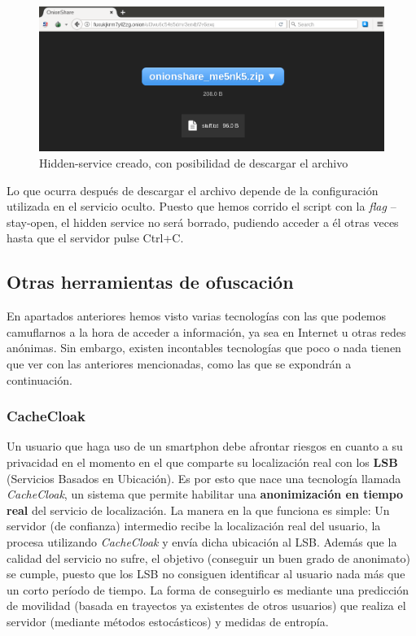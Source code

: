 \begin{figure}[H]
	\centerline{
		\mbox{\includegraphics[width=5.00in]{images/onionshare2.png}}
	}
	\caption{Hidden-service creado, con posibilidad de descargar el archivo}
	\label{fig:onionsharehiddenservice}
\end{figure} 

Lo que ocurra después de descargar el archivo depende de la configuración utilizada en el servicio oculto. Puesto que hemos corrido el script con la \textit{flag } --stay-open, el hidden service no será borrado, pudiendo acceder a él otras veces hasta que el servidor pulse Ctrl+C.

\subsection{Otras herramientas de ofuscación}

En apartados anteriores hemos visto varias tecnologías con las que podemos camuflarnos a la hora de acceder a información, ya sea en Internet u otras redes anónimas. Sin embargo, existen incontables tecnologías que poco o nada tienen que ver con las anteriores mencionadas, como las que se expondrán a continuación.

\subsubsection{CacheCloak}

Un usuario que haga uso de un smartphon debe afrontar riesgos en cuanto a su privacidad en el momento en el que comparte su localización real con los \textbf{LSB} (Servicios Basados en Ubicación). 
Es por esto que nace una tecnología llamada \textit{CacheCloak}, un sistema que permite habilitar una \textbf{anonimización en tiempo real} del servicio de localización.
La manera en la que funciona es simple: Un servidor (de confianza) intermedio recibe la localización real del usuario, la procesa utilizando \textit{CacheCloak} y envía dicha ubicación al LSB.
Además que la calidad del servicio no sufre, el objetivo (conseguir un buen grado de anonimato) se cumple, puesto que los LSB no consiguen identificar al usuario nada más que un corto período de tiempo. 
La forma de conseguirlo es mediante una predicción de movilidad (basada en trayectos ya existentes de otros usuarios) que realiza el servidor (mediante métodos estocásticos) y medidas de entropía.

